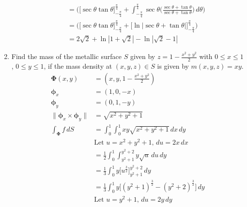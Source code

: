 \documentclass{article}
\newcommand{\norm}[1]{\| #1 \|}
\begin{document}
\begin{enumerate}
\begin{enumerate}
\begin{align*}
             &= \Big( \Big[ \sec \theta \tan \theta \Big]_{-\frac{\pi}{4}}^{\frac{\pi}{4}} + \int_{-\frac{\pi}{4}}^{\frac{\pi}{4}} \sec \theta \Big( \frac{\sec \theta + \tan \theta}{\sec \theta + \tan \theta}\Big)\, d \theta \Big) \\
             &= \Big( \Big[ \sec \theta \tan \theta \Big]_{-\frac{\pi}{4}}^{\frac{\pi}{4}} + \Big[\ln|\sec \theta + \tan \theta |\Big]_{-\frac{\pi}{4}}^{\frac{\pi}{4}} \Big) \\
             &= 2\sqrt2 + \ln |1 + \sqrt2| - \ln |\sqrt2 -1|
        \end{align*} 
    \end{enumerate}
    \newpage
    \item Find the mass of the metallic surface $S$ given by $\displaystyle z = 1 - \frac{x^2 + y^2}{2}$ with $0 \leq x \leq 1$, $0 \leq y \leq 1$, if the mass density at $(x,y,z) \in S$ is given by $m(x,y,z) = xy$.
    \begin{align*}
        \boldsymbol \Phi(x,y) &= (x,y,1 - \frac{x^2 + y^2}{2})\\
        \boldsymbol \phi_x &= (1,0,- x)\\
        \boldsymbol \phi_y &= (0,1,- y)\\
        \norm{\boldsymbol \phi_x \times \boldsymbol \phi_y }&= \sqrt{x^2 + y^2 + 1} \\
        \int_{\boldsymbol \Phi} f\, dS &= \int_0^1 \int_0^1 xy \sqrt{x^2 + y^2 + 1} \, dx \, dy \\
        &\text{Let }u = x^2 + y^2 + 1 ,\, du = 2x \, dx\\
        &= \frac{1}{2}\int_0^1 \int_{y^2+1}^{y^2 + 2} y \sqrt{u} \, du \, dy \\
        &= \frac{1}{3}\int_0^1 y\Big[u^{\frac{3}{2}}\Big]_{y^2+1}^{y^2 + 2} \, dy \\
        &= \frac{1}{3}\int_0^1 y\Big[(y^2+1)^{\frac{3}{2}} - (y^2+2)^{\frac{3}{2}}\Big]\, dy \\
        &\text{Let }u = y^2 + 1 ,\, du = 2y \, dy \\
    \end{align*} 
\end{enumerate}
\end{document}
